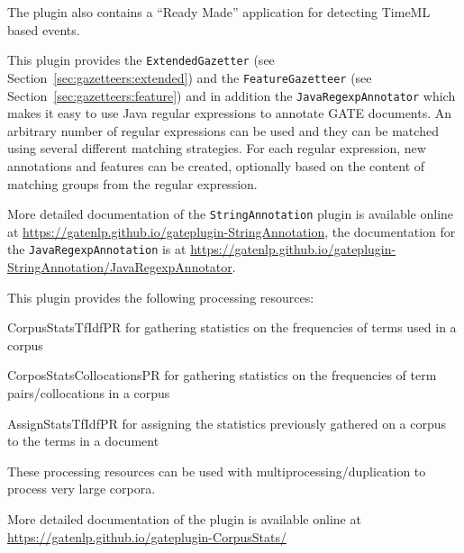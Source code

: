 
The plugin also contains a ``Ready Made'' application for detecting TimeML based events.

%
%
This plugin provides the \texttt{ExtendedGazetter} (see Section~\ref{sec:gazetteers:extended}) and
the \texttt{FeatureGazetteer} (see Section~\ref{sec:gazetteers:feature}) and in addition the 
\texttt{JavaRegexpAnnotator} which makes it easy to use Java regular expressions to annotate
GATE documents. An arbitrary number of regular expressions can be used and they can be
matched using several different matching strategies. For each regular expression, new 
annotations and features can be created, optionally based on the content of matching groups
from the regular expression. 

More detailed documentation of the \texttt{StringAnnotation} plugin is available online at 
\url{https://gatenlp.github.io/gateplugin-StringAnnotation}, the documentation for 
the \texttt{JavaRegexpAnnotation} is at \url{https://gatenlp.github.io/gateplugin-StringAnnotation/JavaRegexpAnnotator}.

%
%
This plugin provides the following processing resources:

\begin{plist}
\item{CorpusStatsTfIdfPR} for gathering statistics on the frequencies of terms used in a corpus
\item{CorposStatsCollocationsPR} for gathering statistics on the frequencies of term pairs/collocations in a corpus
\item{AssignStatsTfIdfPR} for assigning the statistics previously gathered on a corpus to the terms in a document
\end{plist}

These processing resources can be used with multiprocessing/duplication to process very large corpora. 

More detailed documentation of the plugin is available online at
\url{https://gatenlp.github.io/gateplugin-CorpusStats/}


